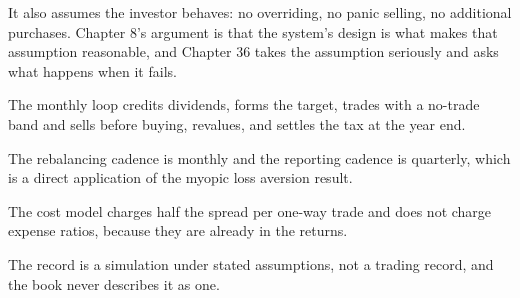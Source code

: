 It also assumes the investor behaves: no overriding, no panic selling, no
additional purchases. Chapter 8's argument is that the system's design
is what makes that assumption reasonable, and Chapter 36 takes the
assumption seriously and asks what happens when it fails.

\begin{keytakeaways}
\item The monthly loop credits dividends, forms the target, trades with a
no-trade band and sells before buying, revalues, and settles the tax at
the year end.
\item The rebalancing cadence is monthly and the reporting cadence is
quarterly, which is a direct application of the myopic loss aversion
result.
\item The cost model charges half the spread per one-way trade and does
not charge expense ratios, because they are already in the returns.
\item The record is a simulation under stated assumptions, not a trading
record, and the book never describes it as one.
\end{keytakeaways}
